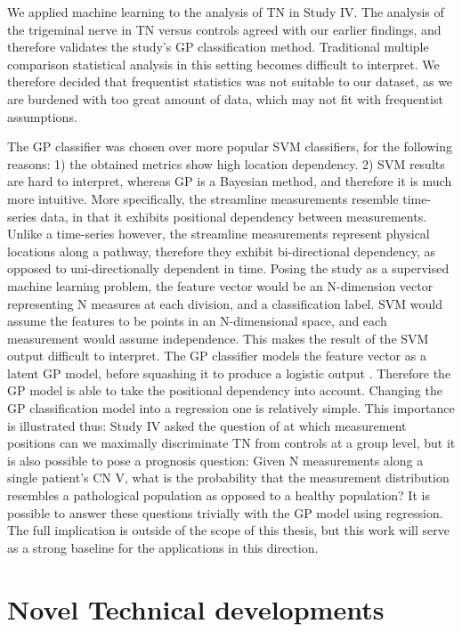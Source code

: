 We applied machine learning to the analysis of TN in Study IV. The analysis of the trigeminal nerve in TN versus controls agreed with our earlier findings, and therefore validates the study's GP classification method. Traditional multiple comparison statistical analysis in this setting becomes difficult to interpret.  We therefore decided that frequentist statistics was not suitable to our dataset, as we are burdened with too great amount of data, which may not fit with frequentist assumptions. 

The GP classifier was chosen over more popular SVM classifiers, for the following reasons: 1) the obtained metrics show high location dependency. 2) SVM results are hard to interpret, whereas GP is a Bayesian method, and therefore it is much more intuitive. More specifically, the streamline measurements resemble time-series data, in that it exhibits positional dependency between measurements. Unlike a time-series however, the streamline measurements represent physical locations along a pathway, therefore they exhibit bi-directional dependency, as opposed to uni-directionally dependent in time. Posing the study as a supervised machine learning problem, the feature vector would be an N-dimension vector representing N measures at each division, and a classification label. SVM would assume the features to be points in an N-dimensional space, and each measurement would assume independence. This makes the result of the SVM output difficult to interpret. The GP classifier models the feature vector as a latent GP model, before squashing it to produce a logistic output \cite{rasmussen2006gaussian}. Therefore the GP model is able to take the positional dependency into account. 
Changing the GP classification model into a regression one is relatively simple. This importance is illustrated thus: Study IV asked the question of at which measurement positions can we maximally discriminate TN from controls at a group level, but it is also possible to pose a prognosis question: Given N measurements along a single patient's CN V, what is the probability that the measurement distribution resembles a pathological population as opposed to a healthy population? It is possible to answer these questions trivially with the GP model using regression. The full implication is outside of the scope of this thesis, but this work will serve as a strong baseline for the applications in this direction. 




\section{Novel Technical developments}

